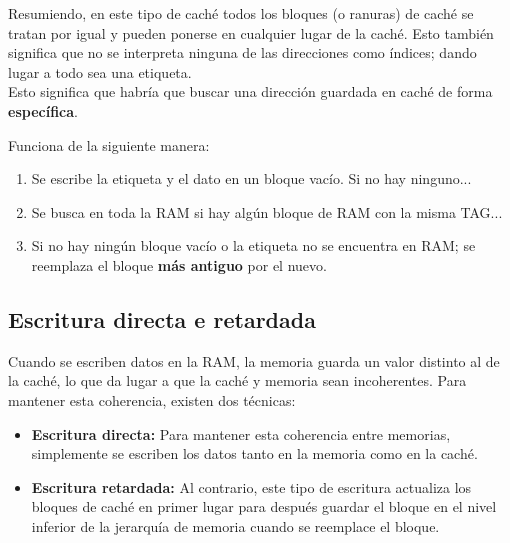 \documentclass[12pt]{article}
\begin{document}
	Resumiendo, en este tipo de caché todos los bloques (o ranuras) de caché se tratan por igual y pueden ponerse en cualquier lugar de la caché. Esto también significa que no se interpreta ninguna de las direcciones como índices; dando lugar a todo sea una etiqueta. \cite{fully_asociative_cache}\\

	\newpage
	Esto significa que habría que buscar una dirección guardada en caché de forma \textbf{específica}.

	Funciona de la siguiente manera:
	\begin{enumerate}
		\item Se escribe la etiqueta y el dato en un bloque vacío. Si no hay ninguno...
		\item Se busca en toda la RAM si hay algún bloque de RAM con la misma TAG...
		\item Si no hay ningún bloque vacío o la etiqueta no se encuentra en RAM; se reemplaza el bloque \textbf{más antiguo} por el nuevo.
	\end{enumerate}

	\subsection{Escritura directa e retardada}

	Cuando se escriben datos en la RAM, la memoria guarda un valor distinto al de la caché, lo que da lugar a que la caché y memoria sean incoherentes. Para mantener esta coherencia, existen dos técnicas:

	\begin{itemize}
		\item \textbf{Escritura directa:} Para mantener esta coherencia entre memorias, simplemente se escriben los datos tanto en la memoria como en la caché. \cite{patterson-2011}
		\item \textbf{Escritura retardada:} Al contrario, este tipo de escritura actualiza los bloques de caché en primer lugar para después guardar el bloque en el nivel inferior de la jerarquía de memoria cuando se reemplace el bloque. \cite{patterson-2011}
	\end{itemize}


	\newpage

	\printbibliography[title={Bibliografía y agradecimientos}]
\end{document}

